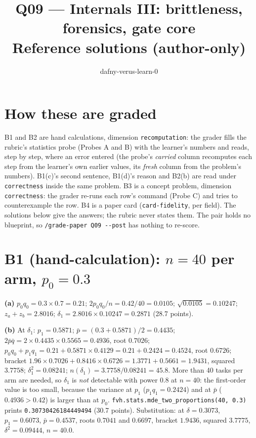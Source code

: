 \documentclass[11pt]{article}
\title{Q09 --- Internals III: brittleness, forensics, gate core \\ \large Reference solutions (author-only)}
\author{dafny-verus-learn-0}
\date{}
\begin{document}
\sloppy
\maketitle

\section*{How these are graded}
B1 and B2 are hand calculations, dimension \texttt{recomputation}: the grader
fills the rubric's statistics probe (Probes A and B) with the learner's numbers
and reads, step by step, where an error entered (the probe's \emph{carried}
column recomputes each step from the learner's own earlier values, its
\emph{fresh} column from the problem's numbers). B1(c)'s second sentence,
B1(d)'s reason and B2(b) are read under \texttt{correctness} inside the same
problem. B3 is a concept problem, dimension \texttt{correctness}: the grader
re-runs each row's command (Probe C) and tries to counterexample the row. B4 is
a paper card (\texttt{card-fidelity}, per field). The solutions below give the
answers; the rubric never states them. The pair holds no blueprint, so
\texttt{/grade-paper Q09 -{}-post} has nothing to re-score.

\section*{B1 (hand-calculation): $n = 40$ per arm, $p_0 = 0.3$}

\textbf{(a)} $p_0 q_0 = 0.3 \times 0.7 = 0.21$; $2 p_0 q_0 / n = 0.42/40 =
0.0105$; $\sqrt{0.0105} = 0.10247$; $z_a + z_b = 2.8016$; $\delta_1 = 2.8016
\times 0.10247 = 0.2871$ (28.7 points).

\textbf{(b)} At $\delta_1$: $p_1 = 0.5871$; $\bar p = (0.3 + 0.5871)/2 =
0.4435$; $2 \bar p \bar q = 2 \times 0.4435 \times 0.5565 = 0.4936$, root
$0.7026$; $p_0 q_0 + p_1 q_1 = 0.21 + 0.5871 \times 0.4129 = 0.21 + 0.2424 =
0.4524$, root $0.6726$; bracket $1.96 \times 0.7026 + 0.8416 \times 0.6726 =
1.3771 + 0.5661 = 1.9431$, squared $3.7758$; $\delta_1^2 = 0.08241$;
$n(\delta_1) = 3.7758/0.08241 = 45.8$. More than 40 tasks per arm are needed,
so $\delta_1$ is \emph{not} detectable with power $0.8$ at $n = 40$: the
first-order value is too small, because the variance at $p_1$ ($p_1 q_1 =
0.2424$) and at $\bar p$ ($0.4936 > 0.42$) is larger than at $p_0$.
\texttt{fvh.stats.mde\_two\_proportions(40, 0.3)} prints
\texttt{0.30730426184449494} (30.7 points). Substitution: at $\delta =
0.3073$, $p_1 = 0.6073$, $\bar p = 0.4537$, roots $0.7041$ and $0.6697$,
bracket $1.9436$, squared $3.7775$, $\delta^2 = 0.09444$, $n = 40.0$.
\end{document}
